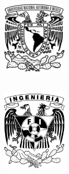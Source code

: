 
\thispagestyle{empty}
\usepackage{setspace}

\hskip-1.1cm
\begin{minipage}[c][10cm][s]{4cm}
  \begin{center}
    \includegraphics[height=3.6cm]{unam_negro}\\[20pt]
    \hskip2pt
    \vrule width1.2pt height 14.5cm\hskip2mm
    \hskip4mm
    \vrule width1.2pt height 14.5cm\\[13pt]\hskip2mm

     \includegraphics[height=4.1cm]{FIUNAM_negro}
  \end{center}
\end{minipage}\quad
